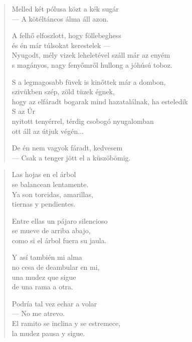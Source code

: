 \documentclass[11pt]{book}
\newcommand*{\centeredornament}{\centerline{\pgfornament[width=6cm]{88}}}
\begin{document}
\newpage

\vspace*{-15mm}
\centeredornament



\begin{verse}
  Melled két pólusa közt a kék sugár \\
  --- A kötéltáncos álma áll azon.

  A felhő elfoszlott, hogy föllebeghess \\
  és én már túlsokat kerestelek --- \\
  Nyugodt, mély vizek leheletével száll már az enyém \\
  s magányos, nagy fenyőmről hullong a jóhúsú toboz.

  S a legmagosabb füvek is kinőttek már a dombon, \\
  szivükben szép, zöld tüzek égnek, \\
  hogy az elfáradt bogarak mind hazatalálnak, ha esteledik \\
  S az Úr \\
  nyitott tenyérrel, térdig csobogó nyugalomban \\
  ott áll az útjuk végén...

  De én nem vagyok fáradt, kedvesem \\
  --- Csak a tenger jött el a küszöbömig.
\end{verse}

\newpage

\vspace*{-15mm}
\centeredornament


\label{las_hojas_en_el_arbol}

\begin{verse}
  Las hojas en el árbol \\
  se balancean lentamente. \\
  Ya son torcidas, amarillas, \\
  tiernas y pendientes.

  Entre ellas un pájaro silencioso \\
  se mueve de arriba abajo, \\
  como si el árbol fuera su jaula.

  Y así también mi alma \\
  no cesa de deambular en mi, \\
  una mudez que sigue \\
  de una rama a otra.

  Podría tal vez echar a volar \\
  --- No me atrevo. \\
  El ramito se inclina y se estremece, \\
  la mudez pausa y sigue.
\end{verse}
\end{document}
